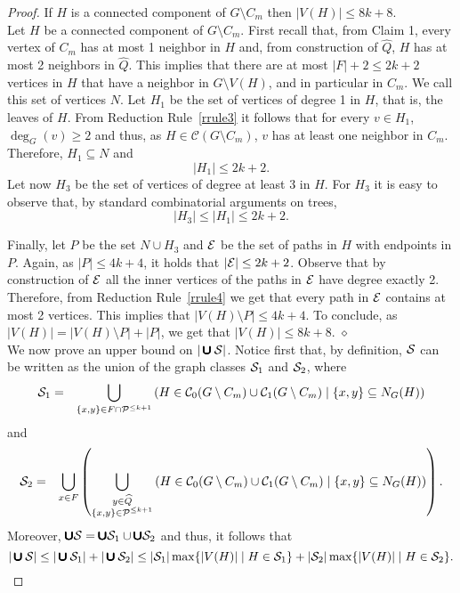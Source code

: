 \documentclass[a4paper,11pt]{article}
\newcommand{\cc}{{\mathcal{C}}}
\newcommand{\cupall}{\pmb{\pmb{\cup}}}
\begin{document}
\begin{proof}
If $H$ is a connected component of $\displaystyle G\setminus C_{m}$ then $|V(H)|\leq 8k+8$.\\

Let $H$ be a connected component of $\displaystyle G\setminus C_{m}$. 
First recall that, from Claim 1, every vertex of $C_{m}$ has at most 1 neighbor in $H$ and, from construction of $\widehat{Q}$, 
$H$ has at most 2 neighbors in $\widehat{Q}$. This implies that there are at most $|F|+2\leq 2k+2$ vertices in $H$ that have a 
neighbor in $G\setminus V(H)$, and in particular in $C_{m}$. We call this set of vertices $N$.
Let $H_{1}$ be the set of vertices of degree 1 in $H$, that is, the leaves of $H$. From Reduction Rule~\ref{rrule3} it follows that for every $v\in H_{1}$, $\deg_{G}(v)\geq 2$ and thus, as $H\in \cc(G\setminus C_{m})$, $v$ has at least one neighbor in $C_{m}$. Therefore, $H_{1}\subseteq N$ and 
$$|H_{1}|\leq 2k+2.$$
Let now $H_{3}$ be the set of vertices of degree at least 3 in $H$. For $H_{3}$ it is easy to observe that, by standard combinatorial arguments on trees, 
$$|H_{3}|\leq |H_{1}|\leq 2k+2.$$

Finally, let $P$ be the set $N\cup H_{3}$ and ${\cal E}$ be the set of paths in $H$ with endpoints in $P$. Again, as $|P|\leq 4k+4$, it holds
that $|{\cal E}|\leq 2k+2$.
Observe that by construction of ${\cal E}$ all the inner vertices of the paths in ${\cal E}$ have degree exactly 2. Therefore, from Reduction Rule~\ref{rrule4} we get that every path in ${\cal E}$ contains at most 2 vertices. This implies that $|V(H)\setminus P|\leq 4k+4$.
To conclude, as $|V(H)|=|V(H)\setminus P|+|P|$, we get that $|V(H)|\leq 8k+8$.
 \hfill $\diamond$\\

\noindent We now prove an upper bound on $|\cupall {\cal S}|$. 
Notice first that, by definition, ${\cal S}$ can be written as the union of the graph classes ${\cal S}_{1}$ and ${\cal S}_{2}$, where 
\begin{eqnarray*}
{\cal S}_{1} & = & \bigcup_{\{x,y\}\in F \cap {\cal P}^{\leq k+1}}\left(H\in\cc_{0}(G\setminus C_{m})\cup\cc_{1}(G\setminus C_{m})\mid 
\{x,y\}\subseteq N_{G}(H)\right)
\end{eqnarray*}
and
\begin{eqnarray*}
{\cal S}_{2} & = & \bigcup_{x\in F}\left(\bigcup_{\substack{y\in \widehat{Q}\\ \{x,y\}\in {\cal P}^{\leq k+1}}} 
 \left(H\in\cc_{0}(G\setminus C_{m})\cup\cc_{1}(G\setminus C_{m})\mid \{x,y\}\subseteq N_{G}(H)\right)\right).
\end{eqnarray*}
Moreover, $\cupall {\cal S} =\cupall {\cal S}_{1} \cup \cupall {\cal S}_{2}$ and thus, it follows that 
\begin{equation}\label{eqngergkmlerg}
|\cupall {\cal S}|\leq |\cupall {\cal S}_{1}| + |\cupall {\cal S}_{2}|\leq |{\cal S}_{1}|\max\{|V(H)|\mid H\in {\cal S}_{1}\}+|{\cal S}_{2}|\max\{|V(H)|\mid H\in {\cal S}_{2}\}.
\end{equation}



\end{proof}
\end{document}

